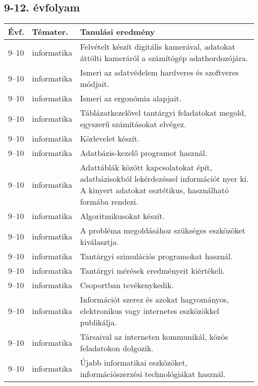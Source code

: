 \subsection{9-12. évfolyam}
\begin{small}
  \begin{longtable}{c | p{2cm} |  p{11cm} }
    \textbf{Évf.} & \textbf{Témater.} & \textbf{Tanulási eredmény} \\ \hline \hline
    \endhead

              9--10 & informatika & Felvételt készít digitális kamerával, adatokat áttölti kameráról a számítógép adathordozójára. \\ \hline
              9--10 & informatika & Ismeri az adatvédelem hardveres és szoftveres módjait. \\ \hline
              9--10 & informatika & Ismeri az ergonómia alapjait. \\ \hline
              9--10 & informatika & Táblázatkezelővel tantárgyi feladatokat megold, egyszerű számításokat elvégez. \\ \hline
              9--10 & informatika & Körlevelet készít. \\ \hline
              9--10 & informatika & Adatbázis-kezelő programot használ. \\ \hline
              9--10 & informatika & Adattáblák között kapcsolatokat épít, adatbázisokból lekérdezéssel információt nyer ki. A kinyert adatokat esztétikus, használható formába rendezi. \\ \hline
              9--10 & informatika & Algoritmikusokat készít. \\ \hline
              9--10 & informatika & A probléma megoldásához szükséges eszközöket kiválasztja. \\ \hline
              9--10 & informatika & Tantárgyi szimulációs programokat használ. \\ \hline
              9--10 & informatika & Tantárgyi mérések eredményeit kiértékeli. \\ \hline
              9--10 & informatika & Csoportban tevékenykedik. \\ \hline
              9--10 & informatika & Információt szerez és azokat hagyományos, elektronikus vagy internetes eszközökkel publikálja. \\ \hline
              9--10 & informatika & Társaival az interneten kommunikál, közös feladatokon dolgozik. \\ \hline
              9--10 & informatika & Újabb informatikai eszközöket, információszerzési technológiákat használ. \\ \hline

\end{longtable}
\end{small}
